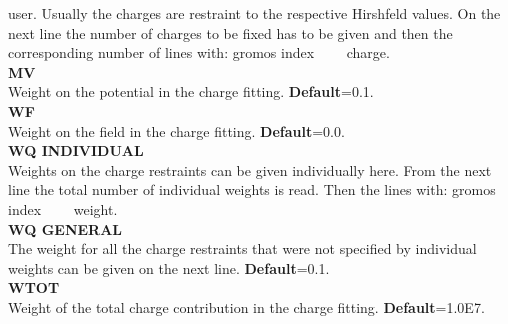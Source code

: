 \documentclass[twoside,10pt,titlepage,a4paper]{article}
\begin{document}
{user. Usually the charges are restraint to the respective Hirshfeld values. On the next line the
number of charges to be fixed has to be given and then the corresponding number of lines with:
gromos index \ \ \ \ charge. \\
\textbf{MV} \\
Weight on the potential in the charge fitting. \textbf{Default}=0.1.\\
\textbf{WF} \\
Weight on the field in the charge fitting. \textbf{Default}=0.0. \\
\textbf{WQ INDIVIDUAL} \\
Weights on the charge restraints can be given individually here. From the next line the total number of individual weights is read. Then the lines with: gromos index \ \ \ \ weight.\\
\textbf{WQ GENERAL} \\
The weight for all the charge restraints that were not specified by individual weights can be given on the next line. \textbf{Default}=0.1. \\
\textbf{WTOT} \\
Weight of the total charge contribution in the charge fitting. \textbf{Default}=1.0E7.}
\end{document}

